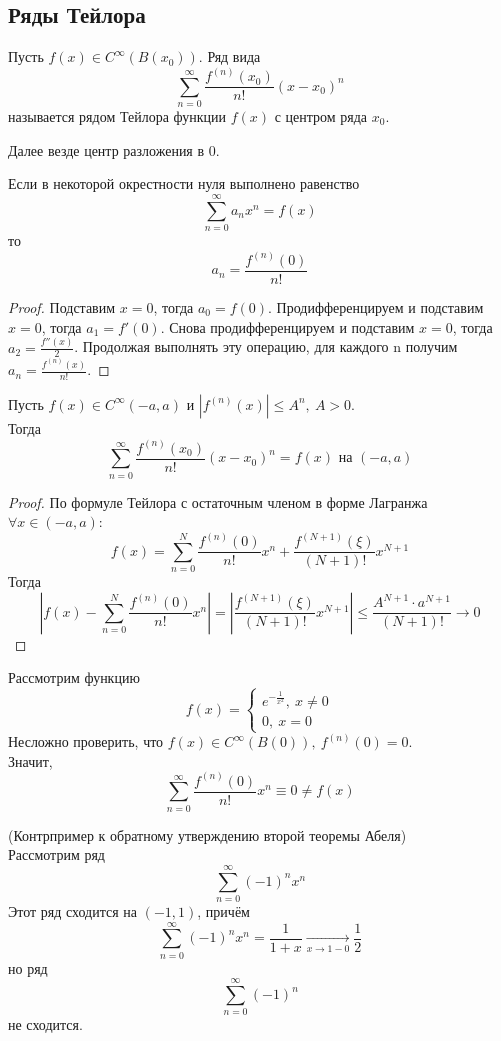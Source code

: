 \subsection{Ряды Тейлора}
\begin{definition}
    Пусть $f(x) \in C^\infty(B(x_0))$. Ряд вида
    \[\sum_{n=0}^{\infty}\frac{f^{(n)}(x_0)}{n!}(x-x_0)^n\]
    называется рядом Тейлора функции $f(x)$ с центром ряда $x_0$.
\end{definition}
\begin{comm}
    Далее везде центр разложения в 0.
\end{comm}
\begin{theorem}
    Если в некоторой окрестности нуля выполнено равенство
    \[\sum_{n=0}^{\infty}a_n x^n = f(x)\]
    то
    \[a_n = \frac{f^{(n)}(0)}{n!}\]
\end{theorem}
\begin{proof}
    Подставим $x=0$, тогда $a_0=f(0)$. Продифференцируем и подставим $x=0$, тогда $a_1=f'(0)$. Снова продифференцируем и подставим $x=0$, тогда $a_2=\frac{f''(x)}{2}$. Продолжая выполнять эту операцию, для каждого n получим $a_n=\frac{f^{(n)}(x)}{n!}$.
\end{proof}
\begin{theorem}
    Пусть $f(x) \in C^\infty(-a, a)$ и $|f^{(n)}(x)| \leq A^n, \ A > 0$.\\
    Тогда
    \[\sum_{n=0}^{\infty}\frac{f^{(n)}(x_0)}{n!}(x-x_0)^n = f(x) \text{ на } (-a, a)\]
\end{theorem}
\begin{proof}
    По формуле Тейлора с остаточным членом в форме Лагранжа $\forall x \in (-a, a)$:
    \[f(x) = \sum_{n=0}^{N}\frac{f^{(n)}(0)}{n!}x^n + \frac{f^{(N+1)}(\xi)}{(N+1)!}x^{N+1}\]
    Тогда
    \[\left| f(x) - \sum_{n=0}^{N}\frac{f^{(n)}(0)}{n!}x^n \right| = \left| \frac{f^{(N+1)}(\xi)}{(N+1)!}x^{N+1}\right| \leq \frac{A^{N+1}\cdot a^{N+1}}{(N+1)!} \rightarrow 0\]
\end{proof}
\begin{example}
    Рассмотрим функцию 
    \[f(x) = \begin{cases}
        e^{-\frac{1}{x^2}}, \ x \neq 0\\
        0, \ x = 0
    \end{cases}\]
    Несложно проверить, что $f(x) \in C^\infty(B(0)),\ f^{(n)}(0) = 0$.\\
    Значит,
    \[\sum_{n=0}^{\infty}\frac{f^{(n)}(0)}{n!}x^n \equiv 0 \neq f(x)\] 
\end{example}
\begin{example} (Контрпример к обратному утверждению второй теоремы Абеля)\\
    Рассмотрим ряд
    \[\sum_{n=0}^{\infty}(-1)^n x^n\]
    Этот ряд сходится на $(-1, 1)$, причём
    \[\sum_{n=0}^{\infty}(-1)^n x^n = \frac{1}{1+x} \underset{x\rightarrow1-0}{\longrightarrow} \frac{1}{2}\]
    но ряд
    \[\sum_{n=0}^{\infty}(-1)^n\]
    не сходится.
\end{example}
